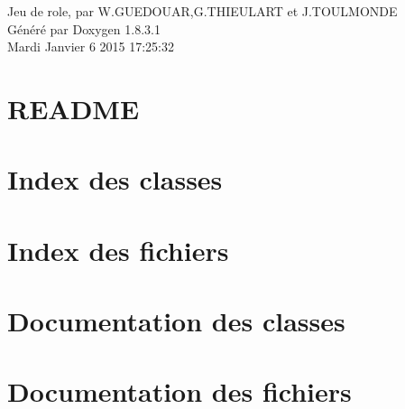 \documentclass{book}
\begin{document}
\hypersetup{pageanchor=false,citecolor=blue}
\begin{titlepage}
\vspace*{7cm}
\begin{center}
{\Large Jeu de role, par W.\-G\-U\-E\-D\-O\-U\-A\-R,G.\-T\-H\-I\-E\-U\-L\-A\-R\-T et J.\-T\-O\-U\-L\-M\-O\-N\-D\-E }\\
\vspace*{1cm}
{\large Généré par Doxygen 1.8.3.1}\\
\vspace*{0.5cm}
{\small Mardi Janvier 6 2015 17:25:32}\\
\end{center}
\end{titlepage}
\clearemptydoublepage
{}
\tableofcontents
\clearemptydoublepage
{}
\hypersetup{pageanchor=true,citecolor=blue}
\chapter{R\-E\-A\-D\-M\-E}
\label{md_README}
\hypertarget{md_README}{}

\chapter{Index des classes}

\chapter{Index des fichiers}

\chapter{Documentation des classes}











\chapter{Documentation des fichiers}





















\printindex
\end{document}
